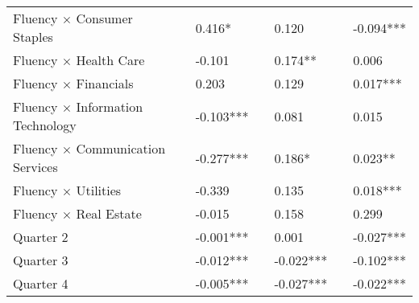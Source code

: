 \documentclass[a4paper,11pt]{report}
\begin{document}
\begin{table}[h!]
\begin{tabular}{llclllc}
\multicolumn{1}{l|}{Fluency $\times$ Consumer Staples}           &  &   \multicolumn{1}{l}{0.416*}                            &  &  0.120                                    &  &   \multicolumn{1}{l}{-0.094***}                           \\
[1ex]
\multicolumn{1}{l|}{Fluency $\times$ Health Care}           &  &   \multicolumn{1}{l}{-0.101}                            &  &    0.174**                                &  &    \multicolumn{1}{l}{0.006}                          \\
[1ex]
\multicolumn{1}{l|}{Fluency $\times$ Financials}           &  &    \multicolumn{1}{l}{0.203}                           &  &      0.129                               &  &   \multicolumn{1}{l}{0.017***}                           \\
[1ex]
\multicolumn{1}{l|}{Fluency $\times$ Information Technology}           &  &    \multicolumn{1}{l}{-0.103***}                           &  &  0.081                                   &  &    \multicolumn{1}{l}{0.015}                          \\
[1ex]
\multicolumn{1}{l|}{Fluency $\times$ Communication Services}           &  &    \multicolumn{1}{l}{-0.277***}                           &  & 0.186*                                    &  &  \multicolumn{1}{l}{0.023**}                            \\
[1ex]
\multicolumn{1}{l|}{Fluency $\times$ Utilities}           &  &  \multicolumn{1}{l}{-0.339}                             &  & 0.135                                    &  &  \multicolumn{1}{l}{0.018***}                            \\
[1ex]
\multicolumn{1}{l|}{Fluency $\times$ Real Estate}           &  &   \multicolumn{1}{l}{-0.015}                            &  & 0.158                                    &  &  \multicolumn{1}{l}{0.299}                            \\
[1ex]
\multicolumn{1}{l|}{Quarter 2}           &  &  \multicolumn{1}{l}{-0.001***}                            &  &  0.001                                    &  &  \multicolumn{1}{l}{-0.027***}                            \\
[0.5ex]
\multicolumn{1}{l|}{Quarter 3}           &  &  \multicolumn{1}{l}{-0.012***}                            &  & -0.022***                                    &  &    \multicolumn{1}{l}{-0.102***}                          \\
[0.5ex]
\multicolumn{1}{l|}{Quarter 4}           &  &  \multicolumn{1}{l}{-0.005***}                             &  & -0.027***                                    &  &  \multicolumn{1}{l}{-0.022***}                             \\

\end{tabular}
\end{table}
\end{document}
